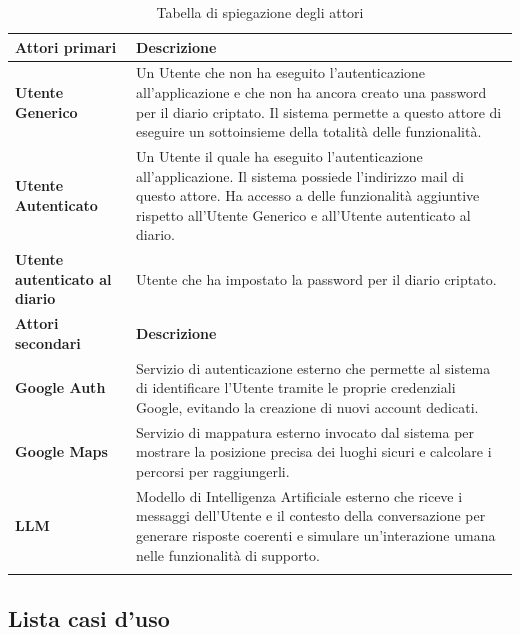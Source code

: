 \documentclass[a4paper,12pt]{article}
\begin{document}
\begin{center}
\small
{}
\begin{longtable}{|p{}|p{}|}

\hline
\rowcolor{gray!70}
\centering \textbf{Attori primari} & \centering \textbf{Descrizione} \tabularnewline
\hline
\endfirsthead
\hline
\endhead
\rowcolor{white}
\centering \textbf{Utente Generico} & Un Utente che non ha eseguito l'autenticazione all'applicazione e che non ha ancora creato una password per il diario criptato. Il sistema permette a questo attore di eseguire un sottoinsieme della totalità delle funzionalità. \\
\hline
\rowcolor{gray!20}
\centering \textbf{Utente Autenticato} & Un Utente il quale ha eseguito l'autenticazione all'applicazione. Il sistema possiede l'indirizzo mail di questo attore. Ha accesso a delle funzionalità aggiuntive rispetto all'Utente Generico e all'Utente autenticato al diario. \\
\hline
\rowcolor{white}
\centering \textbf{Utente autenticato al diario} & Utente che ha impostato la password per il diario criptato. \\
\hline
\rowcolor{gray!70}
\centering \textbf{Attori secondari} & \centering \textbf{Descrizione} \tabularnewline
\hline
\rowcolor{white}
\centering \textbf{Google Auth} & Servizio di autenticazione esterno che permette al sistema di identificare l'Utente tramite le proprie credenziali Google, evitando la creazione di nuovi account dedicati. \\
\hline
\rowcolor{gray!20}
\centering \textbf{Google Maps} & Servizio di mappatura esterno invocato dal sistema per mostrare la posizione precisa dei luoghi sicuri e calcolare i percorsi per raggiungerli. \\
\hline
\rowcolor{white}
\centering \textbf{LLM} & Modello di Intelligenza Artificiale esterno che riceve i messaggi dell'Utente e il contesto della conversazione per generare risposte coerenti e simulare un'interazione umana nelle funzionalità di supporto. \\
\hline

\caption{Tabella di spiegazione degli attori} \label{tab:attori} \\

\end{longtable}
\end{center}


\subsection{Lista casi d'uso}
\end{document}
